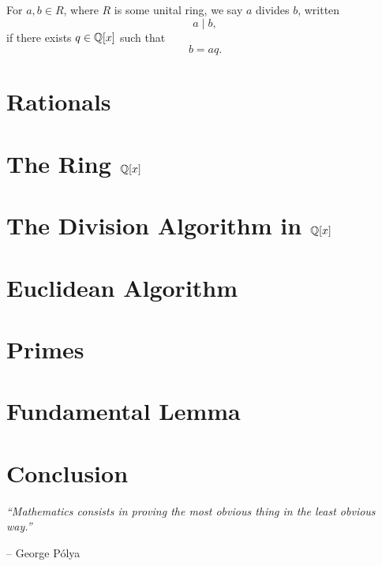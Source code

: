 \begin{definition}[Divisibility]
For $a, b \in R$, where $R$ is some unital ring, we say $a$ divides $b$, written
\[
a\mid b,
\]
if there exists $q\in\mathbb{Q}[x]$ such that
\[
b=aq.
\]

\section{Rationals}


\section{The Ring $\mathbb{Q}[x]$}


\section{The Division Algorithm in $\mathbb{Q}[x]$}


\section{Euclidean Algorithm}



\section{Primes}

\section{Fundamental Lemma}



\section{Conclusion}
\epigraph{\textit{“Mathematics consists in proving the most obvious thing in the least obvious way.”}}{-- George Pólya}


\end{definition}
